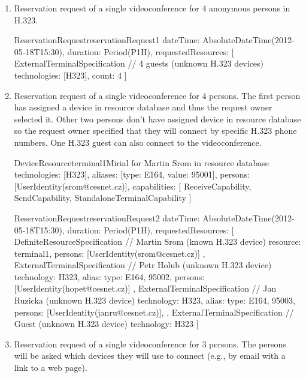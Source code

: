 \begin{enumerate}
\item Reservation request of a single videoconference for 4 anonymous persons in H.323.

\begin{EntityExample}{ReservationRequest}{reservationRequest1}{}
dateTime: AbsoluteDateTime(2012-05-18T15:30), duration: Period(P1H),
requestedResources: [
  ExternalTerminalSpecification { // 4 guests (unknown H.323 devices)
    technologies: [H323],
    count: 4
  }
]
\end{EntityExample}

\item Reservation request of a single videoconference for 4 persons. The first person  has assigned a device in resource database and thus the request owner selected it. Other two persons don't have assigned device in resource database so the request owner specified that they will connect by specific H.323 phone numbers. One H.323 guest can also connect to the videoconference.

\begin{EntityExample}{DeviceResource}{terminal1}{Mirial for Martin Srom in resource database}
technologies: [H323], 
aliases: [{type: E164, value: 95001}],
persons: [UserIdentity(srom@cesnet.cz)],
capabilities: [
  ReceiveCapability, SendCapability, StandaloneTerminalCapability
]
\end{EntityExample}

\begin{EntityExample}{ReservationRequest}{reservationRequest2}{}
dateTime: AbsoluteDateTime(2012-05-18T15:30), duration: Period(P1H),
requestedResources: [
  DefiniteResourceSpecification { // Martin Srom (known H.323 device)
    resource: terminal1,
    persons: [UserIdentity(srom@cesnet.cz)] 
  },
  ExternalTerminalSpecification { // Petr Holub (unknown H.323 device)
    technology: H323,
    alias: {type: E164, 95002},
    persons: [UserIdentity(hopet@cesnet.cz)]
  },
  ExternalTerminalSpecification { // Jan Ruzicka (unknown H.323 device)
    technology: H323,
    alias: {type: E164, 95003},
    persons: [UserIdentity(janru@cesnet.cz)], 
  },
  ExternalTerminalSpecification { // Guest (unknown H.323 device)
    technology: H323
  }
]
\end{EntityExample}

\item Reservation request of a single videoconference for 3 persons. The persons will be asked which devices they will use to connect (e.g., by email with a link to a web page).


\end{enumerate}
